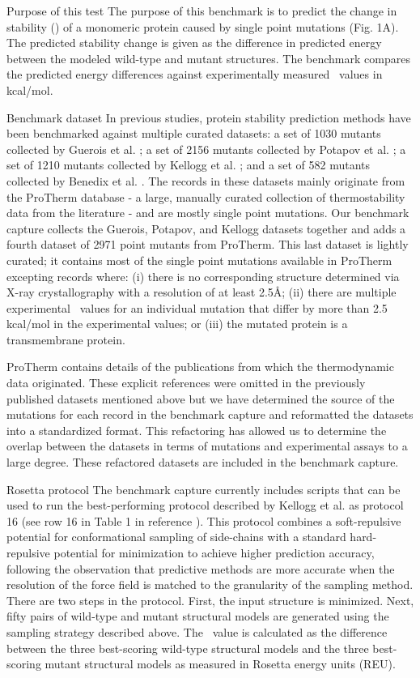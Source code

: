 Purpose of this test
The purpose of this benchmark is to predict the change in stability (\ddg) of a monomeric protein caused by single point mutations (Fig. 1A). The predicted stability change is given as the difference in predicted energy between the modeled wild-type and mutant structures. The benchmark compares the predicted energy differences against experimentally measured \ddg\ values in kcal/mol.

Benchmark dataset
In previous studies, protein stability prediction methods have been benchmarked against multiple curated datasets: a set of 1030 mutants collected by Guerois et al. \cite{guerois_predicting_2002}; a set of 2156 mutants collected by Potapov et al. \cite{potapov_assessing_2009}; a set of 1210 mutants collected by Kellogg et al. \cite{kellogg_role_2011}; and a set of 582 mutants collected by Benedix et al. \cite{benedix_predicting_2009}. The records in these datasets mainly originate from the ProTherm database \cite{kumar_protherm_2006} - a large, manually curated collection of thermostability data from the literature - and are mostly single point mutations. Our benchmark capture collects the Guerois, Potapov, and Kellogg datasets together and adds a fourth dataset of 2971 point mutants from ProTherm. This last dataset is lightly curated; it contains most of the single point mutations available in ProTherm excepting records where: (i) there is no corresponding structure determined via X-ray crystallography with a resolution of at least 2.5Å; (ii) there are multiple experimental \ddg\ values for an individual mutation that differ by more than 2.5 kcal/mol in the experimental values; or (iii) the mutated protein is a transmembrane protein.

ProTherm contains details of the publications from which the thermodynamic data originated. These explicit references were omitted in the previously published datasets mentioned above but we have determined the source of the mutations for each record in the benchmark capture and reformatted the datasets into a standardized format. This refactoring has allowed us to determine the overlap between the datasets in terms of mutations and experimental assays to a large degree. These refactored datasets are included in the benchmark capture.

Rosetta protocol
The benchmark capture currently includes scripts that can be used to run the best-performing protocol described by Kellogg et al. as protocol 16 (see row 16 in Table 1 in reference \cite{kellogg_role_2011}). This protocol combines a soft-repulsive potential for conformational sampling of side-chains with a standard hard-repulsive potential for minimization to achieve higher prediction accuracy, following the observation that predictive methods are more accurate when the resolution of the force field is matched to the granularity of the sampling method. There are two steps in the protocol. First, the input structure is minimized. Next, fifty pairs of wild-type and mutant structural models are generated using the sampling strategy described above. The \ddg\ value is calculated as the difference between the three best-scoring wild-type structural models and the three best-scoring mutant structural models as measured in Rosetta energy units (REU).

